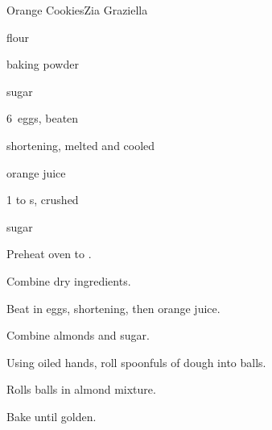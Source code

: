 \begin{recipe}{Orange Cookies\FIXME}{Zia Graziella}{}

\begin{ingredients}
\item {} flour
\item {} baking powder
\item {} sugar
\item 6~eggs, beaten
\item \lbs{\half} shortening, melted and cooled
\item {} orange juice
\item 1 to  s, crushed
\item sugar
\end{ingredients}

\begin{directions}
\item Preheat oven to .
\item Combine dry ingredients.
\item Beat in eggs, shortening, then orange juice.
\item Combine almonds and sugar.
\item Using oiled hands, roll spoonfuls of dough into balls.
\item Rolls balls in almond mixture.
\item Bake until golden. 
\end{directions}

\end{recipe}
